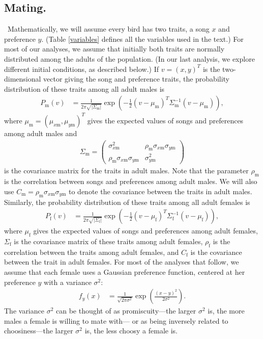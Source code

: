 \documentclass[12pt]{article}
\newcommand{\x}[1]{\text{#1}}
\begin{document}
\subsection*{Mating. }
\ Mathematically, we will assume every bird has two traits, a song $x$ and preference $y$. (Table \ref{variables} defines all the variables used in the text.) For most of our analyses, we assume that initially both traits are normally distributed among the adults of the population. (In our last analysis, we explore different initial conditions, as described below.)
If $v=(x,y)^T$ is the two-dimensional vector giving the song and preference traits, the probability distribution of these traits among all adult males is 
\begin{align*}
P_\x{m}(v)&=\frac{1}{2\pi\sqrt{|\Sigma_\x{m}|}}\exp\left(-\frac{1}{2}(v-\mu_\x{m})^T\Sigma_\x{m}^{-1}(v-\mu_\x{m})\right),
\end{align*} where $\mu_\x{m}=(\mu_{x\x{m}},\mu_{y\x{m}})^T$ gives the expected values of songs and preferences among adult males and 
\begin{align*}
\Sigma_{\x{m}}=\left(\begin{array}{cc}\sigma_{x\x{m}}^2 & \rho_\x{m}\sigma_{x\x{m}}\sigma_{y\x{m}} \\ \rho_\x{m}\sigma_{x\x{m}}\sigma_{y\x{m}} & \sigma_{y\x{m}}^2 \end{array}\right)
\end{align*}
is the covariance matrix for the traits in adult males. Note that the parameter $\rho_\x{m}$ is the correlation between songs and preferences among adult males. We will also use $C_\x{m}=\rho_\x{m}\sigma_{x\x{m}}\sigma_{y\x{m}}$ to denote the covariance between the traits in adult males. Similarly, the probability distribution of these traits among all adult females is 
\begin{align*}
P_\x{f}(v)&=\frac{1}{2\pi\sqrt{|\Sigma_\x{f}|}}\exp\left(-\frac{1}{2}(v-\mu_\x{f})^T\Sigma_\x{f}^{-1}(v-\mu_\x{f})\right), 
\end{align*}
where $\mu_\x{f}$ gives the expected values of songs and preferences among adult females,  $\Sigma_\x{f}$ is the covariance matrix of these traits among adult females, $\rho_\x{f}$ is the correlation between the traits among adult females, and $C_\x{f}$ is the covariance between the trait in adult females. 
For most of the analyses that follow, we assume that each female uses a Gaussian preference function, centered at her preference $y$ with a variance $\sigma^2$:
\begin{align*}
f_y(x)&=\frac{1}{\sqrt{2\pi\sigma^2}}\exp\left(\frac{(x-y)^2}{2\sigma^2}\right).
\end{align*}
The variance $\sigma^2$ can be thought of as promiscuity---the larger $\sigma^2$ is, the more males a female is willing to mate with--- or as being inversely related to choosiness---the larger $\sigma^2$ is, the less choosy a female is. 
\end{document}
